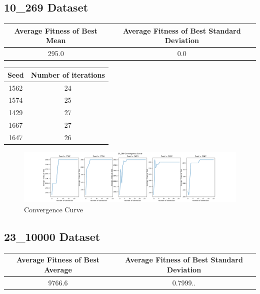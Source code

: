 \documentclass{article}
\begin{document}
\subsection*{10\_269 Dataset}
\begin{center}
\begin{tabular}{|c|c|}
	\hline
	Average Fitness of Best Mean & Average Fitness of Best Standard Deviation \\
	\hline
	295.0 & 0.0 \\
	\hline
\end{tabular}
\end{center}

\begin{center}
	\begin{tabular}{|c|c|}
		\hline
		Seed & Number of iterations \\
		\hline
		1562 & 24 \\
		\hline
		1574 & 25 \\
		\hline
		1429 & 27 \\
		\hline
		1667 & 27 \\
		\hline
		1647 & 26 \\
		\hline
	\end{tabular}
\end{center}

\begin{figure}[h!]
	\centering
	\includegraphics[width=\linewidth]{knapsack_10_269.png}
	\caption{Convergence Curve}
\end{figure}

\subsection*{23\_10000 Dataset}
\begin{center}
	\begin{tabular}{|c|c|}
		\hline
		Average Fitness of Best Average & Average Fitness of Best Standard Deviation \\
		\hline
		9766.6 & 0.7999.. \\
		\hline
	\end{tabular}
\end{center}
\end{document}
